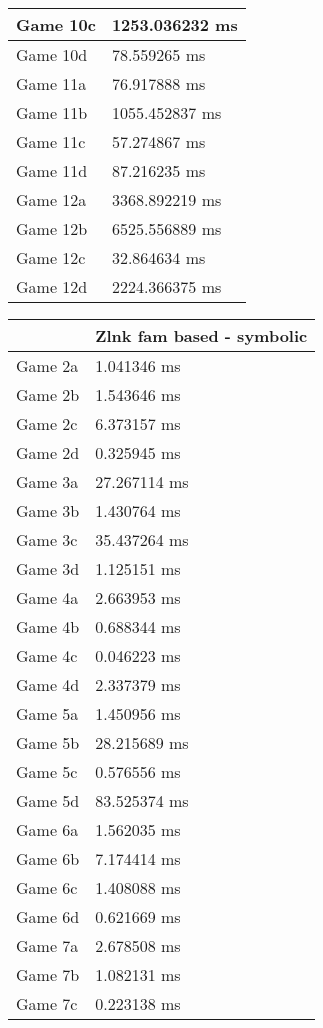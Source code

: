 \begin{tabular}{|l|l|}
	Game 10c & 1253.036232 ms \\ \hline
	Game 10d & 78.559265 ms \\ \hline
	Game 11a & 76.917888 ms \\ \hline
	Game 11b & 1055.452837 ms \\ \hline
	Game 11c & 57.274867 ms \\ \hline
	Game 11d & 87.216235 ms \\ \hline
	Game 12a & 3368.892219 ms \\ \hline
	Game 12b & 6525.556889 ms \\ \hline
	Game 12c & 32.864634 ms \\ \hline
	Game 12d & 2224.366375 ms \\ \hline
\end{tabular}
\begin{tabular}{|l|l|}
	\hline
	& Zlnk fam based - symbolic \\ \hline
	Game 2a & 1.041346 ms \\ \hline
	Game 2b & 1.543646 ms \\ \hline
	Game 2c & 6.373157 ms \\ \hline
	Game 2d & 0.325945 ms \\ \hline
	Game 3a & 27.267114 ms \\ \hline
	Game 3b & 1.430764 ms \\ \hline
	Game 3c & 35.437264 ms \\ \hline
	Game 3d & 1.125151 ms \\ \hline
	Game 4a & 2.663953 ms \\ \hline
	Game 4b & 0.688344 ms \\ \hline
	Game 4c & 0.046223 ms \\ \hline
	Game 4d & 2.337379 ms \\ \hline
	Game 5a & 1.450956 ms \\ \hline
	Game 5b & 28.215689 ms \\ \hline
	Game 5c & 0.576556 ms \\ \hline
	Game 5d & 83.525374 ms \\ \hline
	Game 6a & 1.562035 ms \\ \hline
	Game 6b & 7.174414 ms \\ \hline
	Game 6c & 1.408088 ms \\ \hline
	Game 6d & 0.621669 ms \\ \hline
	Game 7a & 2.678508 ms \\ \hline
	Game 7b & 1.082131 ms \\ \hline
	Game 7c & 0.223138 ms \\ \hline

\end{tabular}
